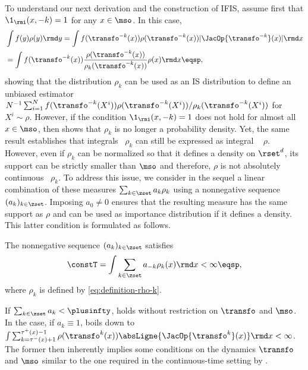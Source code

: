 To understand our next derivation and the construction of IFIS, assume first that  $\1_{\rmi}(x,-k) = 1$ for any $x \in \mso$.  In this case,
\begin{align}
&\int f(y) \rho(y) \rmd y =
\int f(\transfo^{-k}(x)) \rho(\transfo^{-k}(x)) |\JacOp{\transfo^{-k}}(x)|\rmd x 
\\
&=
\int f(\transfo^{-k}(x)) \frac{\rho(\transfo^{-k}(x))}{\rho_k(\transfo^{-k}(x))} \rho(x) \rmd x \eqsp,
\end{align}
showing that the distribution $\rho_k$ can be used as an IS distribution to define an unbiased estimator
$N^{-1}\sum_{i=1}^N f(\transfo^{-k}(X^i))\rho(\transfo^{-k}(X^i))/
\rho_k(\transfo^{-k}(X^i))$  for $X^i\sim \rho$. However, if the condition $\1_{\rmi}(x,-k) = 1$ does not hold for almost all $x \in \mso$, then  shows that $\rho_k$ is no longer a probability density. Yet, the same result establishes that integrals \wrt~$\rho_k$ can still be expressed as integral \wrt~
$\rho$. However, even if $\rho_k$ can be normalized so that it defines a density on $\rset^d$, its support can be strictly smaller than $\mso$ and therefore, $\rho$ is not absolutely continuous \wrt~$\rho_k$. To address this issue, we consider in the sequel a linear combination of these measures $\sum_{k\in\zset} a_k \rho_k$ using a nonnegative sequence $(a_k)_{k \in\zset}$. Imposing $a_0 \neq 0$ ensures that the resulting measure has the same support as $\rho$ and can be used as importance distribution if it defines a density. This latter condition is formulated as follows. 
\begin{assumption}
  \label{assumption:z_ne_finite}
  The nonnegative sequence $(a_k)_{k\in\zset}$ satisfies
\begin{equation}
\label{eq:def_z_ne}
    \constT = 
    \int\sum_{k\in \zset}  a_{-k} \rho_k(x) \rmd x %
    < \infty\eqsp,
  \end{equation}
    where $\rho_k$ is defined by \eqref{eq:definition-rho-k}.
  \end{assumption}
  If $\sum_{k \in\zset} a_k < \plusinfty$,
   holds without restriction on $\transfo$
  and $\mso$. In the case, if $a_k \equiv 1$,
   boils down to
  $ \int\sum_{k= \tau^{-}(x)+1}^{\tau^{+}(x)-1} \rho(\transfo^k(x))
  \absLigne{\JacOp{\transfo^k}(x)} \rmd x< \infty$. The former then inherently implies some conditions on the dynamics $\transfo$ and $\mso$ similar to the one required in the continuous-time setting by \cite{rotskoff:vanden-eijden:2019}. %
  
